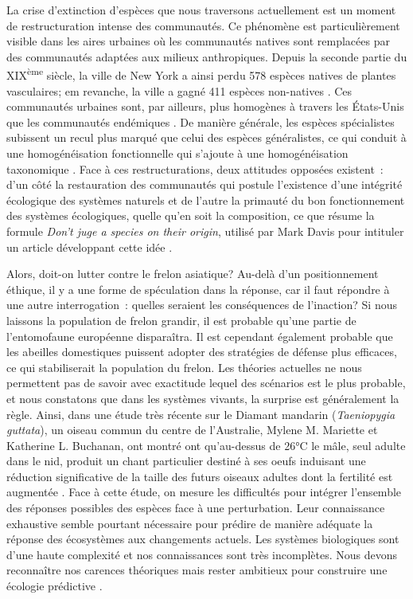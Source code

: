 La crise d'extinction d'espèces que nous traversons actuellement
\citep{Thomas2004} est un moment de restructuration intense des
communautés. Ce phénomène est particulièrement visible dans les aires
urbaines où les communautés natives sont remplacées par des communautés
adaptées aux milieux anthropiques. Depuis la seconde partie du
XIX\textsuperscript{ème} siècle, la ville de New York a ainsi perdu 578
espèces natives de plantes vasculaires; em revanche, la ville a gagné
411 espèces non-natives \citep{DeCandido2004}. Ces communautés urbaines
sont, par ailleurs, plus homogènes à travers les États-Unis que les
communautés endémiques \citep{McKinney2006}. De manière générale, les
espèces spécialistes subissent un recul plus marqué que celui des
espèces généralistes, ce qui conduit à une homogénéisation fonctionnelle
qui s'ajoute à une homogénéisation taxonomique \citep{Clavel2011}. Face
à ces restructurations, deux attitudes opposées existent~: d'un côté la
restauration des communautés qui postule l'existence d'une intégrité
écologique des systèmes naturels \citep{Suding2015} et de l'autre la
primauté du bon fonctionnement des systèmes écologiques, quelle qu'en
soit la composition, ce que résume la formule \emph{Don't juge a species
on their origin}, utilisé par Mark Davis pour intituler un article
développant cette idée \citep{Davis2011}.

Alors, doit-on lutter contre le frelon asiatique? Au-delà d'un
positionnement éthique, il y a une forme de spéculation dans la réponse,
car il faut répondre à une autre interrogation~: quelles seraient les
conséquences de l'inaction? Si nous laissons la population de frelon
grandir, il est probable qu'une partie de l'entomofaune européenne
disparaîtra. Il est cependant également probable que les abeilles
domestiques puissent adopter des stratégies de défense plus efficaces,
ce qui stabiliserait la population du frelon. Les théories actuelles ne
nous permettent pas de savoir avec exactitude lequel des scénarios est
le plus probable, et nous constatons que dans les systèmes vivants, la
surprise est généralement la règle. Ainsi, dans une étude très récente
sur le Diamant mandarin (\emph{Taeniopygia guttata}), un oiseau commun
du centre de l'Australie, Mylene M. Mariette et Katherine L. Buchanan,
ont montré ont qu'au-dessus de 26°C le mâle, seul adulte dans le nid,
produit un chant particulier destiné à ses oeufs induisant une réduction
significative de la taille des futurs oiseaux adultes dont la fertilité
est augmentée \citep{Mariette2016}. Face à cette étude, on mesure les
difficultés pour intégrer l'ensemble des réponses possibles des espèces
face à une perturbation. Leur connaissance exhaustive semble pourtant
nécessaire pour prédire de manière adéquate la réponse des écosystèmes
aux changements actuels. Les systèmes biologiques sont d'une haute
complexité et nos connaissances sont très incomplètes. Nous devons
reconnaître nos carences théoriques mais rester ambitieux pour
construire une écologie prédictive \citep{Mouquet2015}.

